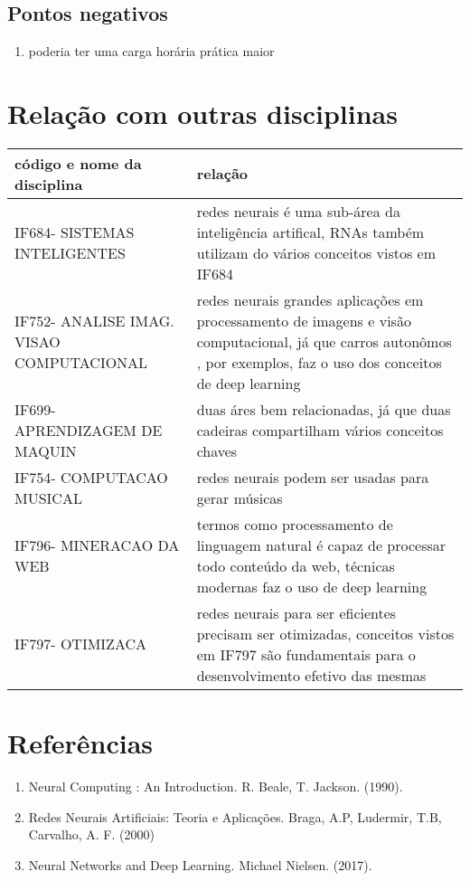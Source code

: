 \documentclass[a4paper,10pt]{article}
\begin{document}
\subsection{Pontos negativos}
\begin{enumerate}
\item poderia ter uma carga horária prática maior

\end{enumerate}

\section{Relação com outras disciplinas}


\begin{center}
    \begin{tabular}{ | l | p{5cm} |}
    \hline
    código e nome da disciplina & relação\\ \hline
    IF684- SISTEMAS INTELIGENTES  & redes neurais é uma sub-área da inteligência artifical, RNAs também utilizam do vários conceitos vistos em IF684  \\ \hline
    
    IF752- ANALISE IMAG. VISAO COMPUTACIONAL  & redes neurais grandes aplicações em processamento de imagens e visão computacional, já que carros autonômos , por exemplos, faz o uso dos conceitos de deep learning \\ \hline
    
    IF699- APRENDIZAGEM DE MAQUIN  & duas áres bem relacionadas, já que duas cadeiras compartilham vários conceitos chaves\\ \hline
    
    IF754- COMPUTACAO MUSICAL   & redes neurais podem ser usadas para gerar músicas \\ \hline
    IF796- MINERACAO DA WEB & termos como processamento de linguagem natural é capaz de processar todo conteúdo da web, técnicas modernas faz o uso de deep learning \\ \hline
    IF797- OTIMIZACA & redes neurais para ser eficientes precisam ser otimizadas, conceitos vistos em IF797 são fundamentais para o desenvolvimento efetivo das mesmas\\ \hline
    
    \end{tabular}
\end{center}


\section{Referências}
\begin{enumerate}
\item Neural Computing : An Introduction. R. Beale, T. Jackson. (1990).
\item Redes Neurais Artificiais: Teoria e Aplicações. Braga, A.P, Ludermir, T.B, Carvalho, A. F. (2000)
\item  Neural Networks and Deep Learning. Michael Nielsen. (2017).
\end{enumerate}






\end{document}
